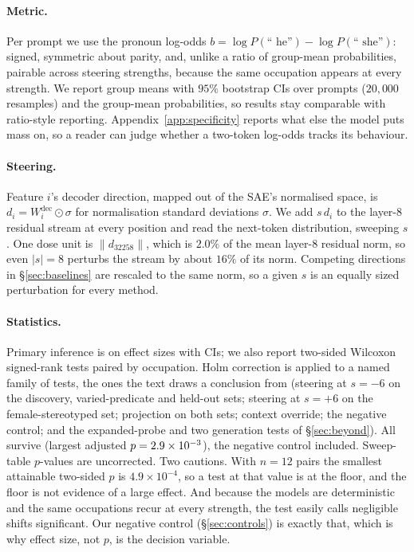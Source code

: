 \documentclass{article}
\newcommand{\phe}{P(\text{`` he''})}
\newcommand{\pshe}{P(\text{`` she''})}
\begin{document}
\paragraph{Metric.}
Per prompt we use the pronoun log-odds $b = \log \phe - \log \pshe$: signed, symmetric
about parity, and, unlike a ratio of group-mean probabilities, pairable across steering
strengths, because the same occupation appears at every strength. We report
group means with $95\%$ bootstrap CIs over prompts ($20{,}000$ resamples) and the
group-mean probabilities, so results stay comparable with ratio-style reporting.
Appendix~\ref{app:specificity} reports what else the model puts mass on, so a reader can
judge whether a two-token log-odds tracks its behaviour.

\paragraph{Steering.}
Feature $i$'s decoder direction, mapped out of the SAE's normalised space, is
$d_i = W^{\text{dec}}_i \odot \sigma$ for normalisation standard deviations $\sigma$. We
add $s\,d_i$ to the layer-8 residual stream at every position and read the next-token
distribution, sweeping $s$. One dose unit is $\lVert d_{32258}\rVert$, which is $2.0\%$
of the mean layer-8 residual norm, so even $|s|=8$ perturbs the stream by about $16\%$ of
its norm. Competing directions in \S\ref{sec:baselines} are rescaled to the same norm, so
a given $s$ is an equally sized perturbation for every method.

\paragraph{Statistics.}
Primary inference is on effect sizes with CIs; we also report two-sided Wilcoxon
signed-rank tests paired by occupation. Holm correction is applied to a named
family of \PrimaryN{} tests, the ones the text draws a conclusion from (steering at
$s=-6$ on the discovery, varied-predicate and held-out sets; steering at $s=+6$ on the
female-stereotyped set; projection on both sets; context override; the negative control; and the expanded-probe
and two generation tests of \S\ref{sec:beyond}).
All \PrimaryN{} survive (largest adjusted $p={}2.9\times10^{-3}$), the negative control
included. Sweep-table $p$-values are uncorrected. Two cautions. With $n=12$ pairs the smallest attainable two-sided $p$ is
$4.9\times10^{-4}$, so a test at that value is at the floor, and the floor is not
evidence of a large effect. And because the models are deterministic and the same
occupations recur at every strength, the test easily calls negligible shifts significant.
Our negative control (\S\ref{sec:controls}) is exactly that, which is why effect size,
not $p$, is the decision variable.
\end{document}
